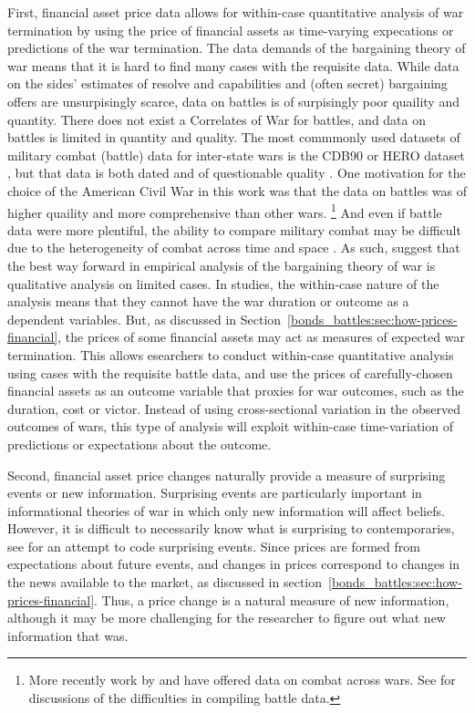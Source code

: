 First, financial asset price data allows for within-case quantitative analysis of war termination by using the price of financial assets as time-varying expecations or predictions of the war termination.
The data demands of the bargaining theory of war means that it is hard to find many cases with the requisite data.
While data on the sides' estimates of resolve and capabilities and (often secret) bargaining offers are unsurpisingly scarce, data on battles is of surpisingly poor quaility and quantity.
There does not exist a Correlates of War for battles, and data on battles is limited in quantity and quality.
The most commmonly used datasets of military combat (battle) data for inter-state wars is the CDB90 or HERO dataset \parencites{HistoricalResearchEtAl1984}{cdb90}, but that data is both dated and of questionable quality \parencites[32]{Reiter2003}{BiddleLong2004}.
One motivation for the choice of the American Civil War in this work was that the data on battles was of higher quaility and more comprehensive than other wars.
\footnote{
More recently work by \textcite{Weisiger2015} and \textcite{CochranLong2014} have offered data on combat across wars.
See \textcites{cdb90}{Helmbold1995} for discussions of the difficulties in compiling battle data.
}
And even if battle data were more plentiful, the ability to compare military combat may be difficult due to the heterogeneity of combat across time and space \parencite{Reiter2009}.
As such, \textcites{Reiter2003}{Reiter2009} suggest that the best way forward in empirical analysis of the bargaining theory of war is qualitative analysis on limited cases.
In studies, the within-case nature of the analysis means that they cannot have the war duration or outcome as a dependent variables.
But, as discussed in Section~\ref{bonds_battles:sec:how-prices-financial}, the prices of some financial assets may act as measures of expected war termination.
This allows esearchers to conduct within-case quantitative analysis using cases with the requisite battle data, and use the prices of carefully-chosen financial assets as an outcome variable that proxies for war outcomes, such as the duration, cost or victor.
Instead of using cross-sectional variation in the observed outcomes of wars, this type of analysis will exploit within-case time-variation of predictions or expectations about the outcome. 

Second, financial asset price changes naturally provide a measure of surprising events or new information.
Surprising events are particularly important in informational theories of war in which only new information will affect beliefs.
However,  it is difficult to necessarily know what is surprising to contemporaries, see \textcite{Shirkey2009a} for an attempt to code surprising events.
Since prices are formed from expectations about future events, and changes in prices correspond to changes in the news available to the market, as discussed in section~\ref{bonds_battles:sec:how-prices-financial}.
Thus, a price change is a natural measure of new information, although it may be more challenging for the researcher to figure out what new information that was.

